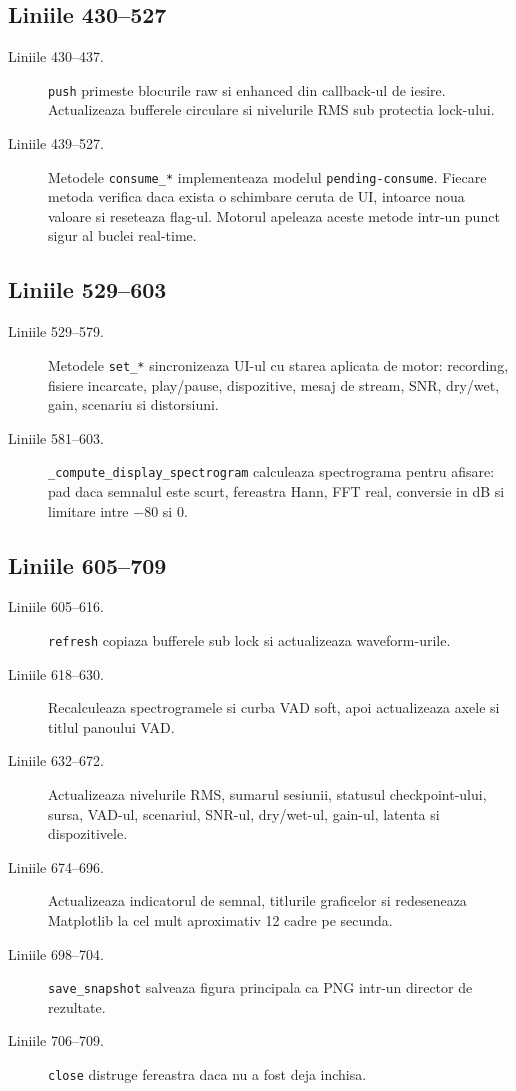 \documentclass[12pt,a4paper]{report}
\newcommand{\chunk}[3]{\subsection*{Liniile #2--#3}}
\begin{document}
\chunk{../src/tools/realtime/ui.py}{430}{527}

\begin{description}
    \item[Liniile 430--437.] \texttt{push} primeste blocurile raw si enhanced din
    callback-ul de iesire. Actualizeaza bufferele circulare si nivelurile RMS sub
    protectia lock-ului.
    \item[Liniile 439--527.] Metodele \texttt{consume\_*} implementeaza modelul
    \texttt{pending-consume}. Fiecare metoda verifica daca exista o schimbare
    ceruta de UI, intoarce noua valoare si reseteaza flag-ul. Motorul apeleaza
    aceste metode intr-un punct sigur al buclei real-time.
\end{description}

\chunk{../src/tools/realtime/ui.py}{529}{603}

\begin{description}
    \item[Liniile 529--579.] Metodele \texttt{set\_*} sincronizeaza UI-ul cu starea
    aplicata de motor: recording, fisiere incarcate, play/pause, dispozitive,
    mesaj de stream, SNR, dry/wet, gain, scenariu si distorsiuni.
    \item[Liniile 581--603.] \texttt{\_compute\_display\_spectrogram} calculeaza
    spectrograma pentru afisare: pad daca semnalul este scurt, fereastra Hann,
    FFT real, conversie in dB si limitare intre \(-80\) si \(0\).
\end{description}

\chunk{../src/tools/realtime/ui.py}{605}{709}

\begin{description}
    \item[Liniile 605--616.] \texttt{refresh} copiaza bufferele sub lock si actualizeaza
    waveform-urile.
    \item[Liniile 618--630.] Recalculeaza spectrogramele si curba VAD soft, apoi
    actualizeaza axele si titlul panoului VAD.
    \item[Liniile 632--672.] Actualizeaza nivelurile RMS, sumarul sesiunii, statusul
    checkpoint-ului, sursa, VAD-ul, scenariul, SNR-ul, dry/wet-ul, gain-ul,
    latenta si dispozitivele.
    \item[Liniile 674--696.] Actualizeaza indicatorul de semnal, titlurile graficelor
    si redeseneaza Matplotlib la cel mult aproximativ 12 cadre pe secunda.
    \item[Liniile 698--704.] \texttt{save\_snapshot} salveaza figura principala ca
    PNG intr-un director de rezultate.
    \item[Liniile 706--709.] \texttt{close} distruge fereastra daca nu a fost deja
    inchisa.
\end{description}
\end{document}
